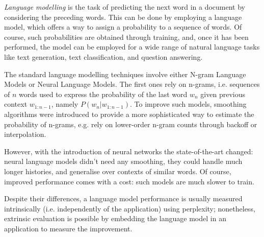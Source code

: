 \textit{Language modelling} is the task of predicting the next word in a document by considering the preceding words. This can be done by employing a language model, which offers a way to assign a probability to a sequence of words. Of course, such probabilities are obtained through training, and, once it has been performed, the model can be employed for a wide range of natural language tasks like text generation, text classification, and question answering.

The standard language modelling techniques involve either N-gram Language Models or Neural Language Models. The first ones rely on n-grams, i.e. sequences of $n$ words used to express the probability of the last word $w_n$ given previous context $w_{1:n-1}$, namely $P(w_n | w_{1:n-1})$. To improve such models, smoothing algorithms were introduced to provide a more sophisticated way to estimate the probability of n-grams, e.g. rely on lower-order n-gram counts through backoff or interpolation.

However, with the introduction of neural networks the state-of-the-art changed: neural language models didn't need any smoothing, they could handle much longer histories, and generalise over contexts of similar words. Of course, improved performance comes with a cost: such models are much slower to train.

Despite their differences, a language model performance is usually measured intrinsically (i.e. independently of the application) using perplexity; nonetheless, extrinsic evaluation is possible by embedding the language model in an application to measure the improvement.